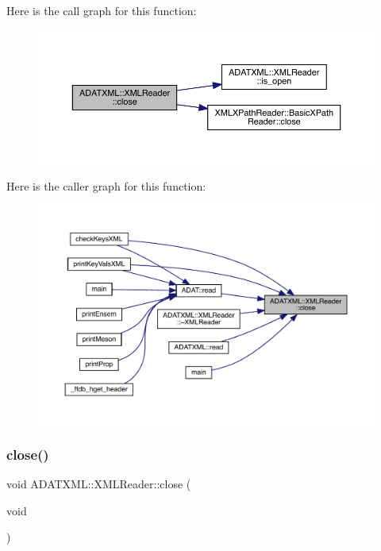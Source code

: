 Here is the call graph for this function\+:
\nopagebreak
\begin{figure}[H]
\begin{center}
\leavevmode
\includegraphics[width=350pt]{db/d3f/classADATXML_1_1XMLReader_a0e5f84d85bb03e1ba3c01a20b1642a36_cgraph}
\end{center}
\end{figure}
Here is the caller graph for this function\+:
\nopagebreak
\begin{figure}[H]
\begin{center}
\leavevmode
\includegraphics[width=350pt]{db/d3f/classADATXML_1_1XMLReader_a0e5f84d85bb03e1ba3c01a20b1642a36_icgraph}
\end{center}
\end{figure}
\mbox{\label{classADATXML_1_1XMLReader_a0e5f84d85bb03e1ba3c01a20b1642a36}} 
\subsubsection{\texorpdfstring{close()}{close()}\hspace{0.1cm}{\footnotesize\ttfamily [2/3]}}
{\footnotesize\ttfamily void A\+D\+A\+T\+X\+M\+L\+::\+X\+M\+L\+Reader\+::close (\begin{DoxyParamCaption}\item[{void}]{ }\end{DoxyParamCaption})\hspace{0.3cm}{\ttfamily [inline]}}



